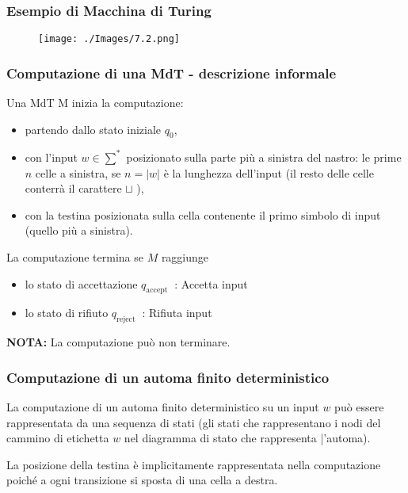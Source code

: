 \subsubsection{Esempio di Macchina di Turing}

\begin{figure}[hbpt!]
    \centering
    \texttt{[image: ./Images/7.2.png]}
\end{figure}
\FloatBarrier

\subsubsection{Computazione di una MdT - descrizione informale}

Una MdT M inizia la computazione:
\begin{itemize}
    \item partendo dallo stato iniziale $q_{0}$,
    \item con l'input $w \in \sum^{*}$ posizionato sulla parte più a sinistra del nastro: le prime $n$ celle a sinistra, se $n=|w|$ è la lunghezza dell'input (il resto delle celle conterrà il carattere $\sqcup$ ),
    \item con la testina posizionata sulla cella contenente il primo simbolo di input (quello più a sinistra).
\end{itemize}
La computazione termina se $M$ raggiunge
\begin{itemize}
    \item lo stato di accettazione $q_{\text {accept }}$ : Accetta input
    \item lo stato di rifiuto $q_{\text {reject }}$ : Rifiuta input
\end{itemize}

\textbf{NOTA:} La computazione può non terminare.

\subsubsection{Computazione di un automa finito deterministico}

La computazione di un automa finito deterministico su un input $w$ può essere rappresentata da una sequenza di stati (gli stati che rappresentano i nodi del cammino di etichetta $w$ nel diagramma di stato che rappresenta |'automa).

La posizione della testina è implicitamente rappresentata nella computazione poiché a ogni transizione si sposta di una cella a destra.

